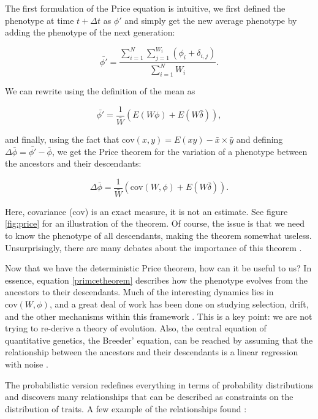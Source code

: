 \documentclass[letterpaper,12pt]{article}
\begin{document}
The first formulation of the Price equation is intuitive, we first defined
the phenotype at time $t + \Delta t$ as $\phi'$ and simply get the new
average phenotype by adding the phenotype of the next generation:

\begin{equation}
  \bar{\phi'} = \frac{\sum_{i=1}^{N}\sum_{j=1}^{W_{i}}\left(\phi_{i} + \delta_{i,j}\right)}{\sum_{i=1}^{N} W_{i}}.
\end{equation}

We can rewrite using the definition of the mean as

\begin{equation}
  \bar{\phi'} = \frac{1}{\bar{W}}\left(E(W\phi) + E(W\bar{\delta})\right),
\end{equation}

and finally, using the fact that $\mbox{cov}(x, y) = E(xy) - \bar{x} \times
\bar{y}$ and defining $\Delta \bar{\phi} = \bar{\phi'} - \bar{\phi}$, we
get the Price theorem for the variation of a phenotype between the ancestors
and their descendants:

\begin{equation}\label{primcetheorem}
  \Delta \bar{\phi} = \frac{1}{\bar{W}}\left(\mbox{cov}(W, \phi) + E(W\bar{\delta})\right).
\end{equation}

Here, covariance ($\mbox{cov}$) is an exact measure, it is not an estimate.
See figure \ref{fig:price} for an illustration of the theorem. Of course,
the issue is that we need to know the phenotype of all descendants, making
the theorem somewhat useless. Unsurprisingly, there are many debates about
the importance of this theorem \cite{ewe04,oka08,fra12}.

Now that we have the deterministic Price theorem, how can it be useful to
us? In essence, equation \ref{primcetheorem} describes how the phenotype
evolves from the ancestors to their descendants. Much of the interesting
dynamics lies in $\mbox{cov}(W, \phi)$, and a great deal of work has been
done on studying selection, drift, and the other mechanisms within this
framework \cite{ric04}. This is a key point: we are not trying to re-derive
a theory of evolution. Also, the central equation of quantitative genetics,
the Breeder' equation, can be reached by assuming that the relationship
between the ancestors and their descendants is a linear regression with
noise \cite{lyn98}.

The probabilistic version \cite{ric08} redefines everything in terms
of probability distributions and discovers many relationships that can
be described as constraints on the distribution of traits. A few example
of the relationships found \cite{ric09}:
\end{document}
